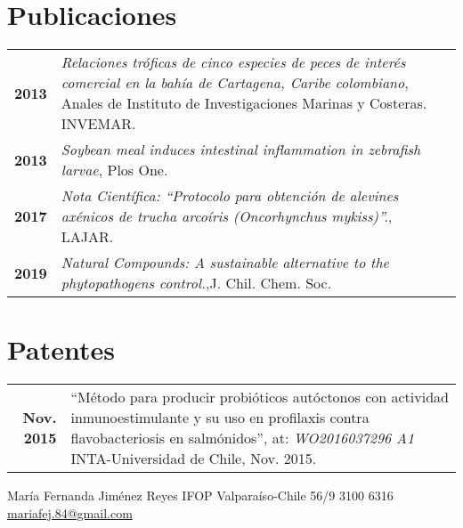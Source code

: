 \documentclass[lighthipster]{simplehipstercv}
\newlength{\rightcolwidth}
\begin{document}
\begin{paracol}{2}
\begin{minipage}[t]{0.3\textwidth}
\section*{Publicaciones}
\begin{tabular}{>{\footnotesize\bfseries}r >{\footnotesize}p{}}
    2013 & \emph{Relaciones tróficas de cinco especies de peces de interés comercial en la bahía de Cartagena, Caribe colombiano}, Anales de Instituto de Investigaciones Marinas y Costeras. INVEMAR. \\
    2013 & \emph{Soybean meal induces intestinal inflammation in zebrafish larvae}, Plos One. \\
     2017 & \emph{Nota Científica: “Protocolo para obtención de alevines axénicos de trucha arcoíris (Oncorhynchus mykiss)”.}, LAJAR. \\
     2019 & \emph{Natural Compounds: A sustainable alternative to the phytopathogens control.},J. Chil. Chem. Soc. \\
    
\end{tabular}
\bigskip

\section*{Patentes}
\begin{tabular}{>{\footnotesize\bfseries}r >{\footnotesize}p{}}
    Nov. 2015 & ``Método para producir probióticos autóctonos con actividad inmunoestimulante y su uso en profilaxis contra flavobacteriosis en salmónidos'', at: \emph{WO2016037296 A1} INTA-Universidad de Chile, Nov. 2015.
\end{tabular}
\end{minipage}






\vfill{} %

\setlength{\parindent}{0pt}
\begin{minipage}[t]{\rightcolwidth}
\begin{center}\fontfamily{\sfdefault}\selectfont \color{black!70}
{\small María Fernanda Jiménez Reyes  IFOP  Valparaíso-Chile  56/9 3100 6316 \newline{} \protect\url{mariafej.84@gmail.com}
}
\end{center}
\end{minipage}

\end{paracol}
\end{document}
